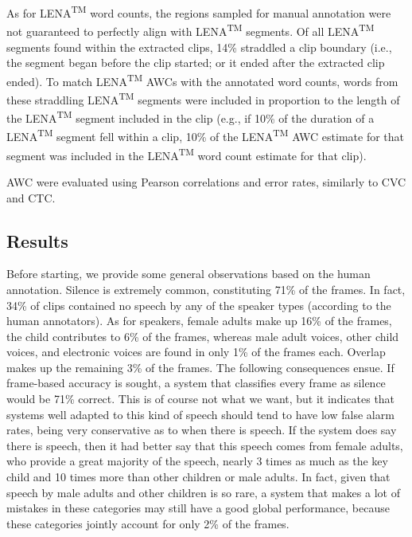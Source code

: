 \documentclass[english,floatsintext,man]{apa6}
\begin{document}
As for LENA\textsuperscript{TM} word counts, the regions sampled for
manual annotation were not guaranteed to perfectly align with
LENA\textsuperscript{TM} segments. Of all LENA\textsuperscript{TM}
segments found within the extracted clips, 14\% straddled a clip
boundary (i.e., the segment began before the clip started; or it ended
after the extracted clip ended). To match LENA\textsuperscript{TM} AWCs
with the annotated word counts, words from these straddling
LENA\textsuperscript{TM} segments were included in proportion to the
length of the LENA\textsuperscript{TM} segment included in the clip
(e.g., if 10\% of the duration of a LENA\textsuperscript{TM} segment
fell within a clip, 10\% of the LENA\textsuperscript{TM} AWC estimate
for that segment was included in the LENA\textsuperscript{TM} word count
estimate for that clip).

AWC were evaluated using Pearson correlations and error rates, similarly
to CVC and CTC.

\subsection{Results}\label{results}

Before starting, we provide some general observations based on the human
annotation. Silence is extremely common, constituting 71\% of the
frames. In fact, 34\% of clips contained no speech by any of the speaker
types (according to the human annotators). As for speakers, female
adults make up 16\% of the frames, the child contributes to 6\% of the
frames, whereas male adult voices, other child voices, and electronic
voices are found in only 1\% of the frames each. Overlap makes up the
remaining 3\% of the frames. The following consequences ensue. If
frame-based accuracy is sought, a system that classifies every frame as
silence would be 71\% correct. This is of course not what we want, but
it indicates that systems well adapted to this kind of speech should
tend to have low false alarm rates, being very conservative as to when
there is speech. If the system does say there is speech, then it had
better say that this speech comes from female adults, who provide a
great majority of the speech, nearly 3 times as much as the key child
and 10 times more than other children or male adults. In fact, given
that speech by male adults and other children is so rare, a system that
makes a lot of mistakes in these categories may still have a good global
performance, because these categories jointly account for only 2\% of
the frames.
\end{document}
